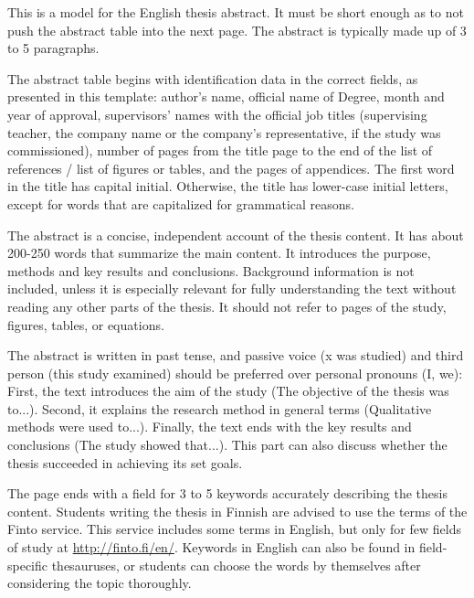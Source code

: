 This is a model for the English thesis abstract.
It must be short enough as to not push the abstract table into the next page.
The abstract is typically made up of 3 to 5 paragraphs.

The abstract table begins with identification data in the correct fields, as presented in this template: author’s name, official name of Degree, month and year of approval, supervisors’ names with the official job titles (supervising teacher, the company name or the company’s representative, if the study was commissioned), number of pages from the title page to the end of the list of references / list of figures or tables, and the pages of appendices.
The first word in the title has capital initial.
Otherwise, the title has lower-case initial letters, except for words that are capitalized for grammatical reasons.

The abstract is a concise, independent account of the thesis content.
It has about 200-250 words that summarize the main content.
It introduces the purpose, methods and key results and conclusions.
Background information is not included, unless it is especially relevant for fully understanding the text without reading any other parts of the thesis.
It should not refer to pages of the study, figures, tables, or equations.

The abstract is written in past tense, and passive voice (x was studied) and third person (this study examined) should be preferred over personal pronouns (I, we): First, the text introduces the aim of the study (The objective of the thesis was to...).
Second, it explains the research method in general terms (Qualitative methods were used to...).
Finally, the text ends with the key results and conclusions (The study showed that...).
This part can also discuss whether the thesis succeeded in achieving its set goals. 

The page ends with a field for 3 to 5 keywords accurately describing the thesis content.
Students writing the thesis in Finnish are advised to use the terms of the Finto service.
This service includes some terms in English, but only for few fields of study at \url{http://finto.fi/en/}.
Keywords in English can also be found in field-specific thesauruses, or students can choose the words by themselves after considering the topic thoroughly.
